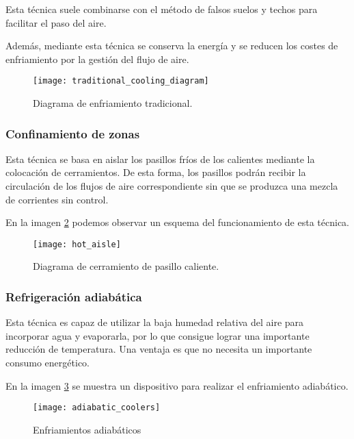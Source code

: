 Esta técnica suele combinarse con el método de falsos suelos y techos para facilitar el paso del aire.

Además, mediante esta técnica se conserva la energía y se reducen los costes de enfriamiento por la gestión del flujo de aire.

\begin{figure}
    \begin{center}
        \label{traditional_cooling}
        \texttt{[image: traditional\_cooling\_diagram]}
        \caption{Diagrama de enfriamiento tradicional.}
    \end{center}
\end{figure}

\subsubsection{Confinamiento de zonas}

Esta técnica se basa en aislar los pasillos fríos de los calientes mediante la colocación de cerramientos. De esta forma, los pasillos podrán recibir la circulación de los flujos de aire correspondiente sin que se produzca una mezcla de corrientes sin control.

En la imagen \ref{hot_aisle} podemos observar un esquema del funcionamiento de esta técnica.

\begin{figure}
    \begin{center}
        \label{hot_aisle}
        \texttt{[image: hot\_aisle]}
        \caption{Diagrama de cerramiento de pasillo caliente.}
    \end{center}
\end{figure}

\subsubsection{Refrigeración adiabática}

Esta técnica es capaz de utilizar la baja humedad relativa del aire para incorporar agua y evaporarla, por lo que consigue lograr una importante reducción de temperatura. Una ventaja es que no necesita un importante consumo energético.

En la imagen \ref{adiabatic_coolers} se muestra un dispositivo para realizar el enfriamiento adiabático.

\begin{figure}
    \begin{center}
        \label{adiabatic_coolers}
        \texttt{[image: adiabatic\_coolers]}
        \caption{Enfriamientos adiabáticos}
    \end{center}
\end{figure}

